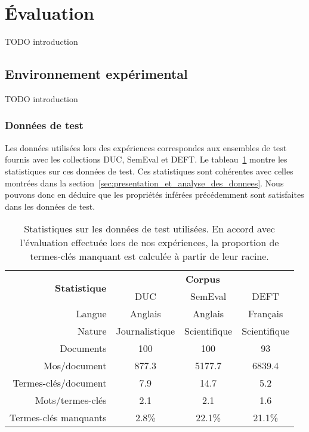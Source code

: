 \section{Évaluation}
\label{sec:evaluation}
  TODO introduction

  \subsection{Environnement expérimental}
  \label{subsec:environnement_experimental}
    TODO introduction

    \subsubsection{Données de test}
    \label{subsubsec:donnees_de_test}
      Les données utilisées lors des expériences correspondes aux ensembles de
      test fournis avec les collections DUC, SemEval et DEFT. Le
      tableau~\ref{tab:donnees_de_test} montre les statistiques sur ces données
      de test. Ces statistiques sont cohérentes avec celles montrées dans la
      section~\ref{sec:presentation_et_analyse_des_donnees}. Nous pouvons donc
      en déduire que les propriétés inférées précédemment sont satisfaites dans
      les données de test.
      \begin{table}
        \centering
        \begin{tabular}{@{~~}rccc@{~~}}
          \toprule
          \multirow{2}{*}[-2pt]{\textbf{Statistique}} & \multicolumn{3}{c}{\textbf{Corpus}}\\
          \cmidrule{2-4}
          & DUC & SemEval & DEFT\\
          \midrule
          Langue & Anglais & Anglais & Français\\
          Nature & Journalistique & Scientifique & Scientifique\\
          Documents & 100 & 100 & 93\\
          Mos/document & 877.3 & 5177.7 & 6839.4\\
          Termes-clés/document & 7.9 & 14.7 & 5.2\\
          Mots/termes-clés & 2.1 & 2.1 & 1.6\\
          Termes-clés manquants & 2.8\% & 22.1\% & 21.1\% \\
          \bottomrule
        \end{tabular}
        \caption{Statistiques sur les données de test utilisées. En accord avec
                 l'évaluation effectuée lors de nos expériences, la proportion
                 de termes-clés manquant est calculée à partir de leur racine.
                 \label{tab:donnees_de_test}}
      \end{table}

